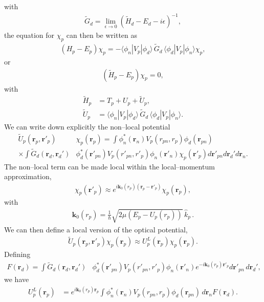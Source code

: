 \documentclass[a4paper,11pt]{article}
\newcommand{\ket}[1]{|{#1} \rangle }
\newcommand{\bra}[1]{\langle {#1}|}
\begin{document}
   with
      \begin{align}\label{eq66}
\widetilde G_d=\lim_{\epsilon\rightarrow 0}(\widetilde H_d-E_d-i\epsilon)^{-1},
      \end{align} 
the equation for $\chi_p$ can then be written as
      \begin{align}\label{eq67}
(H_p-E_p)\chi_p=-\bra{\phi_n}V_p\ket{\phi_d}\,\widetilde G_d\,\bra{\phi_d}V_p\ket{\phi_n}\chi_p,
      \end{align}
or
\begin{align}\label{eq68}
(\widetilde H_p-E_p)\chi_p=0,
\end{align}      
with
\begin{align}\label{eq69}
\nonumber \widetilde H_p&=T_p+U_p+\widetilde U_p,\\
\widetilde U_p&=\bra{\phi_n}V_p\ket{\phi_d}\,\tilde G_d\,\bra{\phi_d}V_p\ket{\phi_n}.
\end{align}  
We can write down explicitly the non--local potential
  \begin{align}\label{eq52}
\nonumber \widetilde U_p(\mathbf r_p,\mathbf r'_p)&\chi_p(\mathbf r_p)
 =   \int  \phi_n^*(\mathbf r_n)V_p(r_{pn},r_p)\phi_d(\mathbf r_{pn})\\
\times \int \widetilde G_d(\mathbf r_d,\mathbf r_d')&\phi_d^*(\mathbf r'_{pn})V_p(r'_{pn},r'_p)\phi_n(\mathbf r'_n)\chi_p(\mathbf r'_p)d\mathbf r'_{pn}d\mathbf r_d'd\mathbf r_n.
 \end{align}
The non--local term can be made local within the local--momentum approximation,
\begin{align}\label{eq28}
\chi_p(\mathbf r'_p)\approx e^{i\mathbf k_0(r_p)(\mathbf r_p-\mathbf r'_p)}\chi_p(\mathbf r_p),
\end{align}
with 
\begin{align}\label{eq29}
\mathbf k_0(r_p)=\frac{1}{\hbar}\sqrt{2\mu\left(E_p-U_p(r_p)\right)}\,\hat k_p\,.
\end{align}
We can then define a local version of the optical potential,
\begin{align}\label{eq31}
\widetilde U_p(\mathbf r_p,\mathbf r'_p)\chi_p(\mathbf r_p)\approx U^L_p(\mathbf r_p)\chi_p(\mathbf r_p).
\end{align}
Defining 
\begin{align}\label{eq71}
F(\mathbf r_d)=\int \widetilde G_d(\mathbf r_d,\mathbf r_d')&\phi_d^*(\mathbf r'_{pn})V_p(r'_{pn},r'_p)\phi_n(\mathbf r'_n)e^{-i\mathbf k_0(r_p)\mathbf r'_p}d\mathbf r'_{pn}\,  d\mathbf r_d',
\end{align}
we have
 \begin{align}\label{eq32}
 U^L_p(\mathbf r_p) &= e^{i\mathbf k_0(r_p)\mathbf r_p}\int  \phi_n^*(\mathbf r_n)V_p(r_{pn},r_p)\phi_d(\mathbf r_{pn})\,d\mathbf r_nF(\mathbf r_d).
 \end{align}
\end{document}

